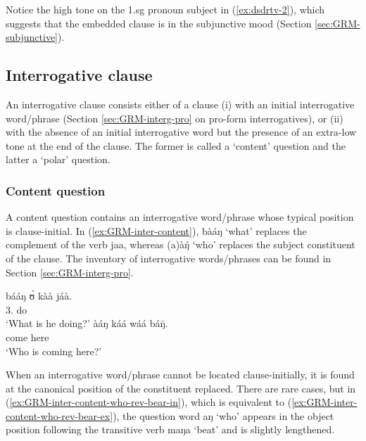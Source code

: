  
 Notice the high tone on the  {\sc 1.sg} pronoun subject  in (\ref{ex:dsdrtv-2}),  which suggests 
that the embedded clause is in the subjunctive mood (Section \ref{sec:GRM-subjunctive}).



\subsection{Interrogative clause}
\label{sec:GRM-interr-clause}

An interrogative clause consists either of a clause (i) with an initial
interrogative word/phrase (Section \ref{sec:GRM-interg-pro} on pro-form 
interrogatives), or (ii) with the absence of an initial interrogative
word but the presence of an extra-low tone at the end of the clause. The former
is called a `content' question and the latter a `polar' question. 

\subsubsection{Content question}
\label{sec:GRM-interr-content}

A content question contains an interrogative word/phrase whose typical position
is clause-initial. In (\ref{ex:GRM-inter-content}), {\sls bàáŋ} `what' 
replaces
the complement of the verb {\sls jaa}, whereas {\sls (a)àŋ́} `who'  replaces
the subject constituent of the clause. The inventory of interrogative
words/phrases can
be found in Section \ref{sec:GRM-interg-pro}.

\ea\label{ex:GRM-inter-content}

\ea\label{ex:GRM-inter-content-what}
\gll bááŋ ʊ̀ kàà jáà.\\
{\q} {3.\sg} {\ipfv} do\\
 \glt  `What is he doing?' 
\ex\label{ex:GRM-inter-content-who}
\gll àáŋ káá wáá báŋ̄.\\
{\q}  {\ipfv} come here\\
\glt  `Who is coming here?'

\z 
 \z

When an interrogative word/phrase cannot be located clause-initially,  it is
found at the canonical position of the constituent replaced. There are
rare cases, but in (\ref{ex:GRM-inter-content-who-rev-bear-in}), which is
equivalent to  (\ref{ex:GRM-inter-content-who-rev-bear-ex}),  the question
word {\sls aŋ} `who' appears in the object position following the transitive 
verb
{\sls maŋa} `beat' and is slightly lengthened. 


